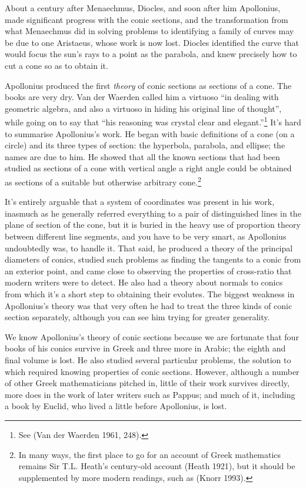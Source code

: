 \documentclass[11pt]{article}
\begin{document}
About a century after Menaechmus, Diocles, and soon after him Apollonius, made significant progress with the conic sections, and the transformation from what Menaechmus did in solving problems to identifying a family of curves may be due to one Aristaeus, whose work is now lost. Diocles identified the curve that would focus the sun's rays to a point as the parabola, and knew precisely how to cut a cone so as to obtain it. 

Apollonius produced the first \emph{theory} of conic sections as sections of a cone. The books are very dry. Van der Waerden called him a virtuoso ``in dealing with geometric algebra, and also a virtuoso in hiding his original line of thought'', while going on to say that ``his reasoning was crystal clear and elegant.''\footnote{See (Van der Waerden 1961, 248).} It's hard to summarise Apollonius's work. He began with basic definitions of a cone (on a circle) and its three types of section: the hyperbola, parabola, and ellipse; the names are due to him. He showed that all the known sections that had been studied as sections of a cone with vertical angle a right angle could be obtained as sections of a suitable but otherwise arbitrary cone.\footnote{In many ways, the first place to go for an account of Greek mathematics remains Sir T.L. Heath's century-old account (Heath 1921), but it should be supplemented by more modern readings, such as (Knorr  1993).}

It's entirely arguable that a system of coordinates was present in his work, inasmuch as he generally referred everything to a pair of distinguished lines in the plane of section of the cone, but it is buried in the heavy use of proportion theory between different line segments, and you have to be very smart, as Apollonius undoubtedly was, to handle it. That said, he produced a theory of the principal diameters of conics, studied such problems as finding the tangents to a conic from an exterior point, and came close to observing the properties of cross-ratio that modern writers were to detect. He also had a theory about normals to conics from which  it's a short step to obtaining their evolutes. The biggest weakness in Apollonius's theory was that very often he had to treat the three kinds of conic section separately, although you can see him trying for greater generality. 

We know Apollonius's theory of conic sections because we are fortunate that  four books of his conics survive in Greek and three more in Arabic; the eighth and final volume is lost. He also studied several particular problems, the solution to which required knowing properties of conic sections.  However, although a number of other Greek mathematicians pitched in, little of  their work survives directly, more does in the work of later writers such as Pappus; and much of it, including a book by Euclid, who lived a little before Apollonius, is lost. 
\end{document}
